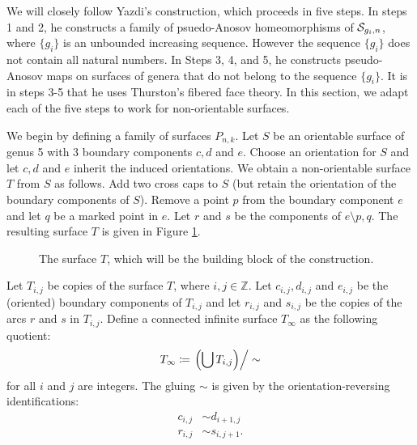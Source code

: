 We will closely follow Yazdi's construction, which proceeds in five steps.  In steps 1 and 2, he constructs a family of psuedo-Anosov homeomorphisms
of $\mathcal{S}_{g_i,n}$, where $\{g_i\}$ is an unbounded increasing sequence. However the sequence $\{g_i\}$ does not contain all natural numbers.  In Steps 3, 4, and 5, he constructs pseudo-Anosov maps on surfaces of genera that do not belong to the sequence $\{g_i\}$. It is in steps 3-5 that he uses
Thurston's fibered face theory. In this section, we adapt each of the five steps to work for
non-orientable surfaces.



We begin by defining a family of surfaces $P_{n,k}$. Let $S$ be an orientable surface of genus 5 with 3
boundary components $c,d$ and $e$. Choose an orientation for $S$ and let $c,d$ and $e$ inherit the induced orientations. We obtain a non-orientable surface $T$ from $S$ as follows.  Add two cross caps to $S$ (but retain the orientation of the boundary components of $S$). Remove a point $p$ from the boundary component $e$ and let $q$ be a marked point in $e$.  Let  $r$ and
$s$ be the components of $e\setminus{p,q}$. The resulting surface $T$ is given in Figure \ref{fig:buildingblock}.

\begin{figure}[]
    \centering
    \caption{The surface $T$, which will be the building block of the construction.}
    \label{fig:buildingblock}
\end{figure}

Let $T_{i,j}$ be copies of the surface $T$, where $i,j \in \mathbb{Z}$. Let $c_{i,j}, d_{i,j}$ and $e_{i,j}$ be the (oriented) boundary components of $T_{i,j}$ and let $r_{i,j}$ and $s_{i,j}$ be the copies of the arcs $r$ and $s$ in $T_{i,j}$. Define a connected infinite surface $T_\infty$ as the following quotient:
\begin{align*}
  T_\infty \coloneqq \left. \left( \bigcup T_{i,j} \right)\right/\sim
\end{align*}
for all $i$ and $j$ are integers. The gluing $\sim$ is given by the orientation-reversing identifications:
\begin{align}
\label{identification}
  c_{i,j} &\sim d_{i+1,j} \\
  r_{i,j} &\sim s_{i,j+1}.
\end{align}


